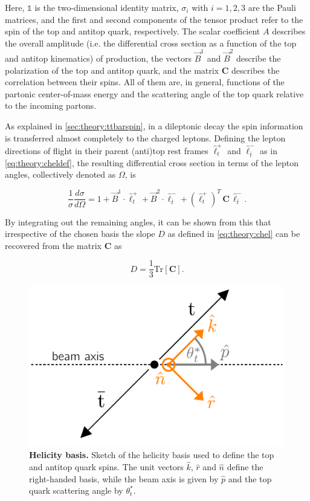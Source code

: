 Here, $\mathbb{1}$ is the two-dimensional identity matrix, $\sigma_i$ with $i=1,2,3$ are the Pauli matrices, and the first and second components of the tensor product refer to the spin of the top and antitop quark, respectively. The scalar coefficient $A$ describes the overall amplitude (i.e. the differential cross section as a function of the top and antitop kinematics) of \ttbar production, the vectors $\vec{B}^1$ and $\vec{B}^2$ describe the polarization of the top and antitop quark, and the matrix $\mathbf{C}$ describes the correlation between their spins. All of them are, in general, functions of the partonic center-of-mass energy and the scattering angle of the top quark relative to the incoming partons.

As explained in \cref{sec:theory:ttbarspin}, in a dileptonic decay the spin information is transferred almost completely to the charged leptons. Defining the lepton directions of flight in their parent (anti)top rest frames $\hat{\ell}_t^+$ and $\hat{\ell}_{\bar{t}}^-$ as in \cref{eq:theory:cheldef}, the resulting differential cross section in terms of the lepton angles, collectively denoted as $\Omega$, is~\cite{Anuar:PhD}

\begin{equation}
    \frac{1}{\sigma} \frac{d \sigma}{d \Omega} = 1 + \vec{B}^1 \cdot \hat{\ell}_t^+ + \vec{B}^2 \cdot \hat{\ell}_{\bar{t}}^- + (\hat{\ell}_t^+)^T \, \mathbf{C} \, \hat{\ell}_{\bar{t}}^- .
\end{equation}

By integrating out the remaining angles, it can be shown from this that irrespective of the chosen basis the slope $D$ as defined in \cref{eq:theory:chel} can be recovered from the matrix $\mathbf{C}$ as~\cite{Bernreuther:2004jv,Bernreuther:2017yhg}

\begin{equation}
    D = \frac{1}{3} \mathrm{Tr} \left[ \mathbf{C} \right] .
\end{equation}

\begin{figure}[t]
  \centering
  \includegraphics[width=0.6\linewidth]{figures/helicity_basis_new.pdf}
  \caption{\textbf{Helicity basis.} Sketch of the helicity basis used to define the top and antitop quark spins. The unit vectors $\hat{k}$, $\hat{r}$ and $\hat{n}$ define the right-handed basis, while the beam axis is given by $\hat{p}$ and the top quark scattering angle by $\theta^*_t$.}
  \label{fig:theory:helicitybasis}
\end{figure}


